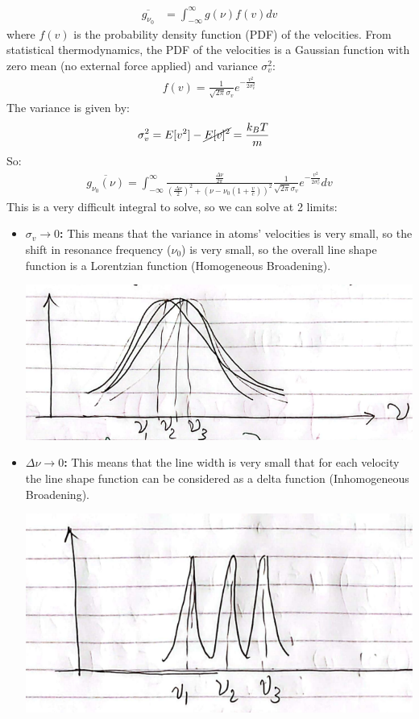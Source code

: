 \documentclass[11pt]{article}
\begin{document}
\begin{align*}
    \overline{g_{\nu_0}} &= \int_{-\infty}^{\infty} g(\nu) f(v) dv
\end{align*}
where $f(v)$ is the probability density function (PDF) of the velocities. From statistical thermodynamics, the PDF of the velocities is a Gaussian function with zero mean (no external force applied) and variance $\sigma_v^2$:
\begin{align*}
    f(v) = \frac{1}{\sqrt{2 \pi} \sigma_v} e^{-\frac{v^2}{2 \sigma_v^2}}
\end{align*}
The variance is given by:
\begin{align*}
    \sigma_v^2 &= E[v^2] - \cancel{E[v]^2} = \frac{k_BT}{m}
\end{align*}
So:
\begin{align*}
    \overline{g_{\nu_0}(\nu)} = \int_{-\infty}^{\infty} \frac{\frac{\Delta \nu}{2 \pi}}{(\frac{\Delta \nu}{2})^2 + (\nu - \nu_0(1 + \frac{v}{c}))^2} \frac{1}{\sqrt{2 \pi} \sigma_v} e^{-\frac{v^2}{2 \sigma_v^2}} dv
\end{align*}
This is a very difficult integral to solve, so we can solve at 2 limits:
\begin{itemize}
    \item \textbf{$\sigma_v \rightarrow 0$:} This means that the variance in atoms' velocities is very small, so the shift in resonance frequency ($\nu_0$) is very small, so the overall line shape function is a Lorentzian function (Homogeneous Broadening).
        \begin{center}
            \includegraphics[scale=0.6]{3.png}
        \end{center}
    \item \textbf{$\Delta \nu \rightarrow 0$:} This means that the line width is very small that for each velocity the line shape function can be considered as a delta function (Inhomogeneous Broadening).
        \begin{center}
            \includegraphics[scale=0.6]{4.png}
        \end{center}
\end{itemize}
\end{document}
